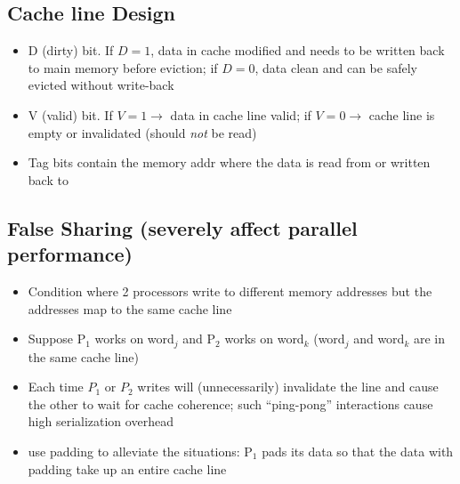 \subsection*{Cache line Design}
\begin{itemize}
\item \textsf{D} (dirty) bit.  If $D=1$, data in cache modified and needs to be written back to main memory before eviction; if $D=0$, data clean and can be safely evicted without write-back
\item \textsf{V} (valid) bit.  If $V=1 \to$ data in cache line valid; if $V=0 \to$ cache line is empty or invalidated (should \emph{not} be read)
\item Tag bits contain the memory addr where the data is read from or written back to
\end{itemize}
\subsection*{False Sharing (severely affect parallel performance)}
\begin{itemize}
\item Condition where 2 processors write to different memory addresses but the addresses map to the same cache line
\item Suppose P$_1$ works on word$_j$ and P$_2$ works on word$_k$ (word$_j$ and word$_k$ are in the same cache line)
\item Each time $P_1$ or $P_2$ writes will (unnecessarily) invalidate the line and cause the other to wait for cache coherence; such ``ping-pong'' interactions cause high serialization overhead
\item use padding to alleviate the situations: P$_1$ pads its data so that the data with padding take up an entire cache line
\end{itemize}
